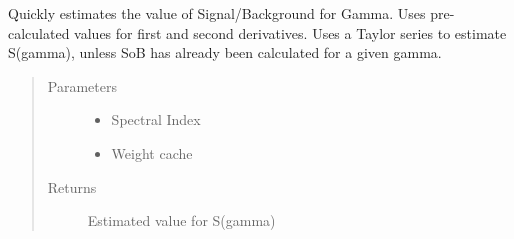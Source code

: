 \documentclass[letterpaper,10pt,english]{sphinxmanual}
\begin{document}
\begin{fulllineitems}
\begin{fulllineitems}
\label{\detokenize{index:flarestack.core.llh.StandardLLH.estimate_energy_weights}}
Quickly estimates the value of Signal/Background for Gamma.
Uses pre-calculated values for first and second derivatives.
Uses a Taylor series to estimate S(gamma), unless SoB has already
been calculated for a given gamma.
\begin{quote}\begin{description}
\item[{Parameters}] \leavevmode\begin{itemize}
\item {} 
 \textendash{} Spectral Index

\item {} 
 \textendash{} Weight cache

\end{itemize}

\item[{Returns}] \leavevmode
Estimated value for S(gamma)

\end{description}\end{quote}

\end{fulllineitems}


\begin{fulllineitems}
\label{\detokenize{index:flarestack.core.llh.StandardLLH.fit_energy}}
\end{fulllineitems}



\end{fulllineitems}
\end{document}
